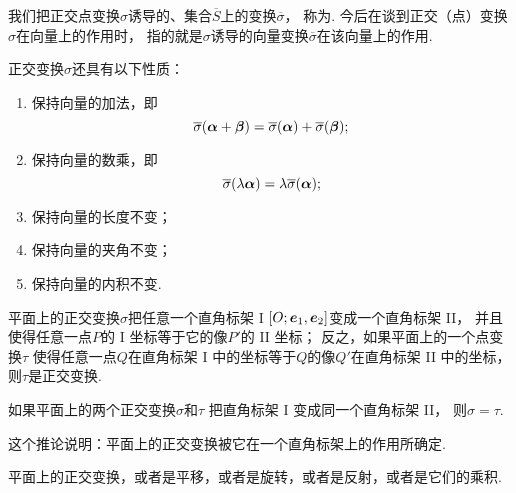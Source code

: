 我们把正交点变换\(\sigma\)诱导的、集合\(\overline{S}\)上的变换\(\overline{\sigma}\)，
称为.
今后在谈到正交（点）变换\(\sigma\)在向量上的作用时，
指的就是\(\sigma\)诱导的向量变换\(\overline{\sigma}\)在该向量上的作用.

\begin{property}
正交变换\(\sigma\)还具有以下性质：\begin{enumerate}
	\item 保持向量的加法，即\begin{equation*}
		\overline{\sigma}(\boldsymbol\alpha+\boldsymbol\beta)
		= \overline{\sigma}(\boldsymbol\alpha)
		+ \overline{\sigma}(\boldsymbol\beta);
	\end{equation*}

	\item 保持向量的数乘，即\begin{equation*}
		\overline{\sigma}(\lambda \boldsymbol\alpha)
		= \lambda \overline{\sigma}(\boldsymbol\alpha);
	\end{equation*}

	\item 保持向量的长度不变；

	\item 保持向量的夹角不变；

	\item 保持向量的内积不变.
\end{enumerate}
\end{property}

\begin{theorem}
平面上的正交变换\(\sigma\)把任意一个直角标架 I \([O;\boldsymbol{e}_1,\boldsymbol{e}_2]\)变成一个直角标架 II，
并且使得任意一点\(P\)的 I 坐标等于它的像\(P'\)的 II 坐标；
反之，如果平面上的一个点变换\(\tau\)
使得任意一点\(Q\)在直角标架 I 中的坐标等于\(Q\)的像\(Q'\)在直角标架 II 中的坐标，
则\(\tau\)是正交变换.
\end{theorem}

\begin{corollary}
如果平面上的两个正交变换\(\sigma\)和\(\tau\)
把直角标架 I 变成同一个直角标架 II，
则\(\sigma = \tau\).
\end{corollary}
\begin{remark}
这个推论说明：平面上的正交变换被它在一个直角标架上的作用所确定.
\end{remark}

\begin{theorem}
平面上的正交变换，或者是平移，或者是旋转，或者是反射，或者是它们的乘积.
\end{theorem}

